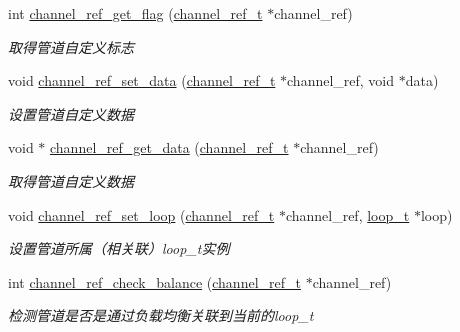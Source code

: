 \begin{DoxyCompactItemize}
int \hyperlink{a00041_a684027d23ecd45142ee91678972b48da_a684027d23ecd45142ee91678972b48da}{channel\+\_\+ref\+\_\+get\+\_\+flag} (\hyperlink{a00044_a151271c9d188ef28d4d24bb81dcc1263_a151271c9d188ef28d4d24bb81dcc1263}{channel\+\_\+ref\+\_\+t} $\ast$channel\+\_\+ref)
\begin{DoxyCompactList}\small\item\em 取得管道自定义标志 \end{DoxyCompactList}\item 
void \hyperlink{a00041_aa639e4f322194aa76b0d01368f086bc0_aa639e4f322194aa76b0d01368f086bc0}{channel\+\_\+ref\+\_\+set\+\_\+data} (\hyperlink{a00044_a151271c9d188ef28d4d24bb81dcc1263_a151271c9d188ef28d4d24bb81dcc1263}{channel\+\_\+ref\+\_\+t} $\ast$channel\+\_\+ref, void $\ast$data)
\begin{DoxyCompactList}\small\item\em 设置管道自定义数据 \end{DoxyCompactList}\item 
void $\ast$ \hyperlink{a00041_ae6545b9c070a0bab99ccfefdf0b4a999_ae6545b9c070a0bab99ccfefdf0b4a999}{channel\+\_\+ref\+\_\+get\+\_\+data} (\hyperlink{a00044_a151271c9d188ef28d4d24bb81dcc1263_a151271c9d188ef28d4d24bb81dcc1263}{channel\+\_\+ref\+\_\+t} $\ast$channel\+\_\+ref)
\begin{DoxyCompactList}\small\item\em 取得管道自定义数据 \end{DoxyCompactList}\item 
void \hyperlink{a00041_ad7b9246a8768f761ffdd1756ea389181_ad7b9246a8768f761ffdd1756ea389181}{channel\+\_\+ref\+\_\+set\+\_\+loop} (\hyperlink{a00044_a151271c9d188ef28d4d24bb81dcc1263_a151271c9d188ef28d4d24bb81dcc1263}{channel\+\_\+ref\+\_\+t} $\ast$channel\+\_\+ref, \hyperlink{a00044_a9c3ad1cd2de83e09f3a7b59fa82c94ee_a9c3ad1cd2de83e09f3a7b59fa82c94ee}{loop\+\_\+t} $\ast$loop)
\begin{DoxyCompactList}\small\item\em 设置管道所属（相关联）loop\+\_\+t实例 \end{DoxyCompactList}\item 
int \hyperlink{a00084_gae003fde214ddbf4feec22ddb89b8257c_gae003fde214ddbf4feec22ddb89b8257c}{channel\+\_\+ref\+\_\+check\+\_\+balance} (\hyperlink{a00044_a151271c9d188ef28d4d24bb81dcc1263_a151271c9d188ef28d4d24bb81dcc1263}{channel\+\_\+ref\+\_\+t} $\ast$channel\+\_\+ref)
\begin{DoxyCompactList}\small\item\em 检测管道是否是通过负载均衡关联到当前的loop\+\_\+t \end{DoxyCompactList}\item 

\end{DoxyCompactItemize}
